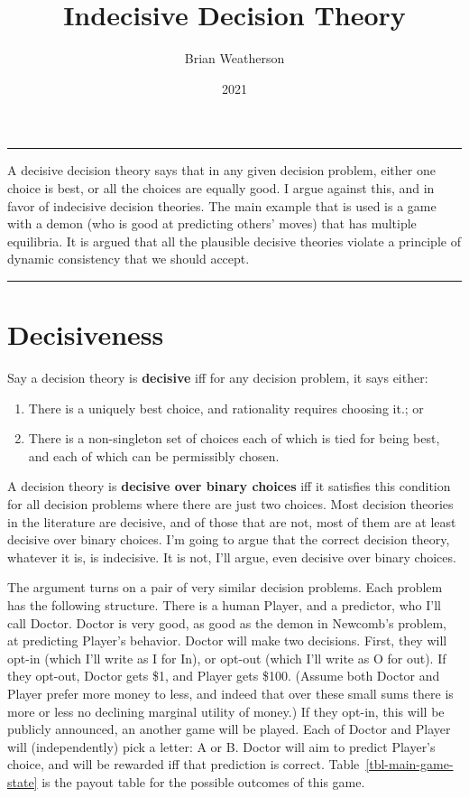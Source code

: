 \documentclass[
  10pt,
  letterpaper,
  DIV=11,
  numbers=noendperiod,
  twoside]{scrartcl}
\title{Indecisive Decision Theory}
\author{Brian Weatherson}
\date{2021}
\providecommand{\tightlist}{%
  \setlength{\itemsep}{0pt}\setlength{\parskip}{0pt}}\usepackage{longtable,booktabs,array}
\renewenvironment{abstract}
 {\vspace{-1.25cm}
 \quotation\small\noindent\rule{\linewidth}{.5pt}\par\smallskip
 \noindent }
 {\par\noindent\rule{\linewidth}{.5pt}\endquotation}
\begin{document}
\maketitle
\begin{abstract}
A decisive decision theory says that in any given decision problem,
either one choice is best, or all the choices are equally good. I argue
against this, and in favor of indecisive decision theories. The main
example that is used is a game with a demon (who is good at predicting
others' moves) that has multiple equilibria. It is argued that all the
plausible decisive theories violate a principle of dynamic consistency
that we should accept.
\end{abstract}


\section{Decisiveness}\label{decisiveness}

Say a decision theory is \textbf{decisive} iff for any decision problem,
it says either:

\begin{enumerate}
\def\labelenumi{\arabic{enumi}.}
\tightlist
\item
  There is a uniquely best choice, and rationality requires choosing
  it.; or
\item
  There is a non-singleton set of choices each of which is tied for
  being best, and each of which can be permissibly chosen.
\end{enumerate}

A decision theory is \textbf{decisive over binary choices} iff it
satisfies this condition for all decision problems where there are just
two choices. Most decision theories in the literature are decisive, and
of those that are not, most of them are at least decisive over binary
choices. I'm going to argue that the correct decision theory, whatever
it is, is indecisive. It is not, I'll argue, even decisive over binary
choices.

The argument turns on a pair of very similar decision problems. Each
problem has the following structure. There is a human Player, and a
predictor, who I'll call Doctor. Doctor is very good, as good as the
demon in Newcomb's problem, at predicting Player's behavior. Doctor will
make two decisions. First, they will opt-in (which I'll write as I for
In), or opt-out (which I'll write as O for out). If they opt-out, Doctor
gets \$1, and Player gets \$100. (Assume both Doctor and Player prefer
more money to less, and indeed that over these small sums there is more
or less no declining marginal utility of money.) If they opt-in, this
will be publicly announced, an another game will be played. Each of
Doctor and Player will (independently) pick a letter: A or B. Doctor
will aim to predict Player's choice, and will be rewarded iff that
prediction is correct. Table~\ref{tbl-main-game-state} is the payout
table for the possible outcomes of this game.
\end{document}
